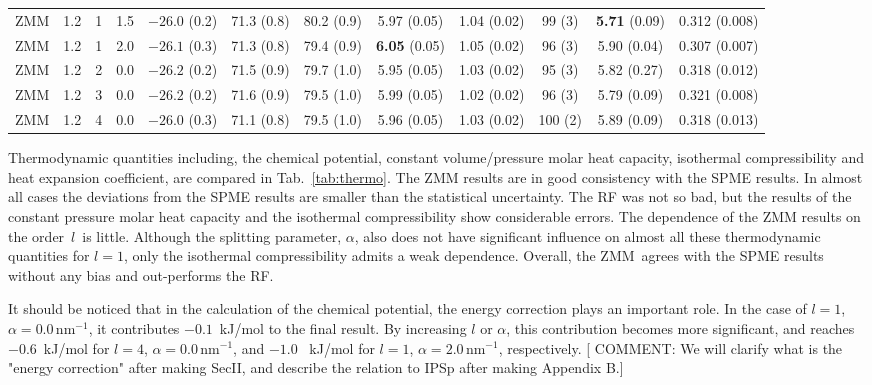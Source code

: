 \documentclass[a4paper,preprint,unsortedaddress,onecolumn,fleqn]{revtex4}
\begin{document}
\begin{sidewaystable}
\begin{tabular*}{0.99\textwidth}{@{\extracolsep{\fill}}cccc cccccccc}
    ZMM          &1.2 & 1  &1.5 & $-26.0$ (0.2) & 71.3 (0.8)  &80.2 (0.9)           & 5.97 (0.05)               &1.04 (0.02)          & 99 (3)          & \textbf{5.71} (0.09)&        {0.312} (0.008)\\ 
    ZMM          &1.2 & 1  &2.0 & $-26.1$ (0.3) & 71.3 (0.8)  &79.4 (0.9)           & \textbf{6.05} (0.05)      &1.05 (0.02)          & 96 (3)          &        {5.90} (0.04)&        {0.307} (0.007)\\\hline
    ZMM          &1.2 & 2  &0.0 & $-26.2$ (0.2) & 71.5 (0.9)  &79.7 (1.0)           & 5.95 (0.05)               &1.03 (0.02)          & 95 (3)          &         5.82  (0.27)&         0.318  (0.012)\\
    ZMM          &1.2 & 3  &0.0 & $-26.2$ (0.2) & 71.6 (0.9)  &79.5 (1.0)           & 5.99 (0.05)               &1.02 (0.02)          & 96 (3)          &         5.79  (0.09)&         0.321  (0.008)\\
    ZMM          &1.2 & 4  &0.0 & $-26.0$ (0.3) & 71.1 (0.8)  &79.5 (1.0)           & 5.96 (0.05)               &1.03 (0.02)          &100 (2)          &         5.89  (0.09)&         0.318  (0.013)\\
    \hline\hline
  \end{tabular*}
  \label{tab:thermo}
\end{sidewaystable}

Thermodynamic quantities including, the chemical potential, constant
volume/pressure molar heat capacity, isothermal compressibility and heat
expansion coefficient, are compared in Tab.~\ref{tab:thermo}. The ZMM
results are in good consistency with the SPME results. In almost all cases
the deviations from the SPME results are smaller than the statistical
uncertainty. The RF was not so bad, but the results of the constant pressure
molar heat capacity and the isothermal compressibility show considerable
errors. The dependence of the ZMM results on the order\ $l$\ is little.
Although the splitting parameter, $\alpha $, also does not have significant
influence on almost all these thermodynamic quantities for $l=1$, only the
isothermal compressibility admits a weak dependence. Overall, the ZMM\
agrees with the SPME results without any bias and out-performs the RF.

It should be noticed that in the calculation of the chemical potential, the
energy correction plays an important role. In the case of $l=1$, $\alpha
=0.0\,\text{nm}^{-1}$, it contributes $-0.1$~kJ/mol to the final result. By
increasing $l$ or $\alpha $, this contribution becomes more significant, and
reaches $-0.6$~kJ/mol for $l=4$, $\alpha =0.0\,\text{nm}^{-1}$, and $-1.0$%
~kJ/mol for $l=1$, $\alpha =2.0\,\text{nm}^{-1}$, respectively. [{%
\color{blue}COMMENT: We will clarify what is the "energy correction" after
making SecII, and describe the relation to IPSp after making Appendix B.}]
\end{document}
